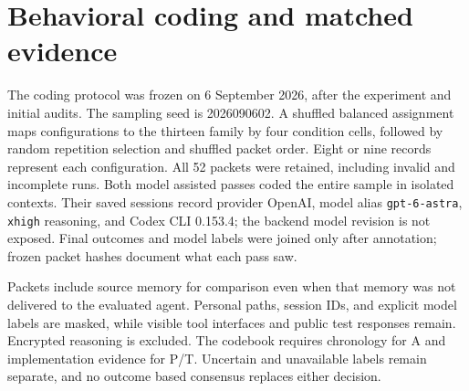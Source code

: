 \clearpage
\section{Behavioral coding and matched evidence}
\label{app:behavior}
\begin{table}[h]
\centering\small
\caption{Three matched transcript, implementation, and outcome panels, all GPT-5.5 Low/Codex. Quotes are exact saved visible excerpts; implementation summaries refer to final patches. Panel A compares repetitions within C; panels B and C compare conditions in repetition 1. These cases were selected after outcome inspection, separately from the sampled coding.}
\label{tab:cases}
\end{table}

The coding protocol was frozen on 6 September 2026, after the experiment and initial audits. The sampling seed is 2026090602. A shuffled balanced assignment maps configurations to the thirteen family by four condition cells, followed by random repetition selection and shuffled packet order. Eight or nine records represent each configuration. All 52 packets were retained, including invalid and incomplete runs. Both model assisted passes coded the entire sample in isolated contexts. Their saved sessions record provider OpenAI, model alias \texttt{gpt-6-astra}, \texttt{xhigh} reasoning, and Codex CLI 0.153.4; the backend model revision is not exposed. Final outcomes and model labels were joined only after annotation; frozen packet hashes document what each pass saw.

Packets include source memory for comparison even when that memory was not delivered to the evaluated agent. Personal paths, session IDs, and explicit model labels are masked, while visible tool interfaces and public test responses remain. Encrypted reasoning is excluded. The codebook requires chronology for A and implementation evidence for P/T. Uncertain and unavailable labels remain separate, and no outcome based consensus replaces either decision.

\begin{table}[ht]
\centering\small
\caption{Full label distributions. ``Paired resolved'' counts records labeled yes or no by both passes. Four-category Cohen's $\kappa$ includes uncertain and unavailable labels and describes the two model-assisted passes; it is not human annotation reliability or label validation.}
\end{table}


